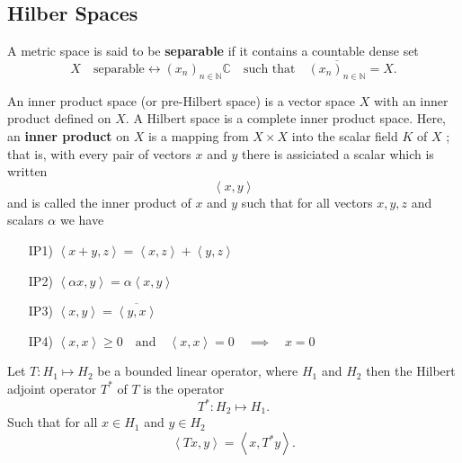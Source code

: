 \documentclass{article}
\theoremstyle{remark}
\begin{document}
\subsection{Hilber Spaces}%
\label{sub:hilber_spaces}
\begin{definition}[Separable]
  A metric space is said to be \textbf{separable} if it contains a countable dense set
  \[
 X \quad \text{separable} \leftrightarrow \left( x_{n} \right)_{n \in \mathbb{N}} \mathbb{C} \quad \text{such that} \quad   \overline{\left( x_{n} \right)_{n \in\mathbb{N}} } = X  .
  \] 
\end{definition}


\begin{definition}
  An inner product space (or pre-Hilbert space) is a vector space $X$ with an inner product defined on  $X$. A Hilbert space is a complete inner product space. Here, an \textbf{inner product} on $X$ is a mapping from $X \times X $ into the scalar field $K$ of $X$ ; that is,  with every pair of vectors $x$ and $y$ there is assiciated a scalar which is written \[
  \left<x,y \right>
  \] and is called the inner product of $x$ and  $y$ such that for all vectors $x,y,z$ and scalars $\alpha$ we have 
  \begin{enumerate}
    \item[IP1)] $\left< x +y ,z\right> = \left<x,z \right> + \left<y,z \right>$ 
    \item[IP2)] $\left<\alpha x , y \right> = \alpha \left<x,y \right> $
    \item[IP3)] $ \left<x,y \right> =\overline{\left<  y,x\right>} $
    \item[IP4)] $ \left<x,x \right> \ge 0 \quad \text{and} \quad \left<x,x \right> = 0 \quad \implies \quad x= 0    $
  \end{enumerate}
  
\end{definition}

\begin{definition}
  Let $T: H_1 \mapsto H_2$ be a bounded linear operator, where $H_1$ and $H_2$ then the Hilbert adjoint operator $T^{*}$ of $T$ is the operator \[
  T^{*}: H_2 \mapsto H_1 .
  \] 
  Such that for all $x \in H_1$ and $y \in H_2$ 
  \begin{equation}
  \label{eq:ajoint}
  \left<Tx,y \right> = \left<x,  T^{*}y \right>
  .\end{equation}
  
\end{definition}
\end{document}
